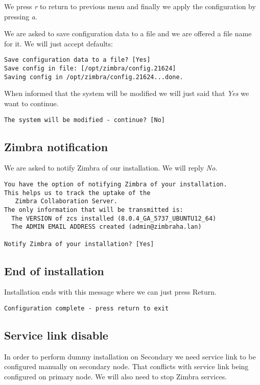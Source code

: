 We press \textit{r} to return to previous menu and finally we apply the configuration by pressing \textit{a}.

We are asked to save configuration data to a file and we are offered a file name for it. We will just accept defaults:
\begin{verbatim}
Save configuration data to a file? [Yes] 
Save config in file: [/opt/zimbra/config.21624] 
Saving config in /opt/zimbra/config.21624...done.
\end{verbatim}

When informed that the system will be modified we will just said that \textit{Yes} we want to continue.

\begin{verbatim}
The system will be modified - continue? [No] 
\end{verbatim}

\subsection {Zimbra notification}
We are asked to notify Zimbra of our installation. We will reply \textit{No}.

\begin{verbatim}
You have the option of notifying Zimbra of your installation.
This helps us to track the uptake of the
   Zimbra Collaboration Server.
The only information that will be transmitted is:
  The VERSION of zcs installed (8.0.4_GA_5737_UBUNTU12_64)
  The ADMIN EMAIL ADDRESS created (admin@zimbraha.lan)

Notify Zimbra of your installation? [Yes]
\end{verbatim}

\subsection {End of installation}
Installation ends with this message where we can just press Return.

\begin{verbatim}
Configuration complete - press return to exit
\end{verbatim}

\subsection {\label{service-link-disable}Service link disable}
In order to perform dummy installation on Secondary we need service link to be configured manually on secondary node. That conflicts with service link being configured on primary node. We will also need to stop Zimbra services.

